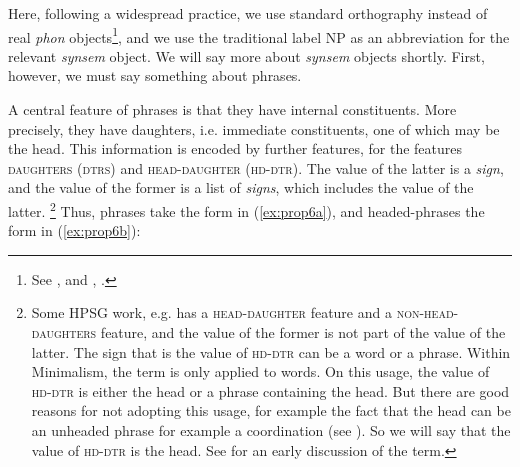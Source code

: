 \documentclass[output=paper
	        ,collection
	        ,collectionchapter
 	        ,biblatex
                ,babelshorthands
                ,newtxmath
                ,draftmode
                ,colorlinks, citecolor=brown
]{langscibook}
\begin{document}
\ea\label{ex:prop5}
\z


Here, following a widespread practice, we use standard orthography instead of real \emph{phon}
objects\footnote{%
See \citet{BK94b}, \citet{Hoehle99a-u} and , .
},
and we use the traditional label NP as an abbreviation for the relevant \emph{synsem} object. We will say more about \emph{synsem} objects shortly. First, however, we must say something about phrases.

A central feature of phrases is that they have internal constituents. More precisely, they have daughters, i.e. immediate constituents, one of which may be the head. This information is encoded by further features, for \citet[29]{GSag2000a-u} the features \textsc{daughters} (\textsc{dtrs}) and \textsc{head-daughter} (\textsc{hd-dtr}). The value of the latter is a \emph{sign}, and the value of the former is a list of \emph{signs}, which includes the value of the latter.%
%
\footnote{Some HPSG work, e.g. \citet{Sag97a} has a \textsc{head-daughter} feature and a \textsc{non-head-daughters} feature, and the value of the former is not part of the value of the latter. The sign that is the value of \textsc{hd-dtr} can be a word or a phrase. Within Minimalism, the term  is only applied to words. On this usage, the value of \textsc{hd-dtr} is either the head or a phrase containing the head. But there are good reasons for not adopting this usage, for example the fact that the head can be an unheaded phrase for example a coordination (see ). So we will say that the value of \textsc{hd-dtr} is the head. See \citet[30]{Jackendoff77a} for an early discussion of the term.}
%
Thus, phrases take the form in (\ref{ex:prop6a}), and headed-phrases the form in (\ref{ex:prop6b}):

\begin{multicols}{2}
\ea\label{ex:prop6}
	\ea\label{ex:prop6a}

\columnbreak
	
	\ex\label{ex:prop6b}
	\z
\z
\end{multicols}
\end{document}
